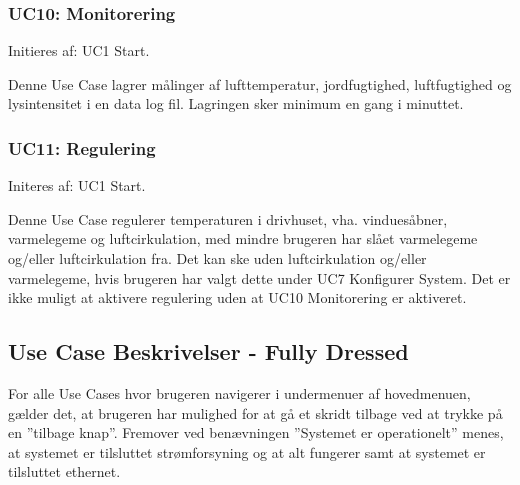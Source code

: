 \subsubsection{UC10: Monitorering}
Initieres af: UC1 Start.

Denne Use Case lagrer målinger af lufttemperatur, jordfugtighed, luftfugtighed og lysintensitet i en data log fil. 
Lagringen sker minimum en gang i minuttet. 

\subsubsection{UC11: Regulering}
Initeres af: UC1 Start.

Denne Use Case regulerer temperaturen i drivhuset, vha. vinduesåbner, varmelegeme og luftcirkulation, med mindre brugeren har slået varmelegeme og/eller luftcirkulation fra. 
Det kan ske uden luftcirkulation og/eller varmelegeme, hvis brugeren har valgt dette under UC7 Konfigurer System. Det er ikke muligt at aktivere regulering uden at UC10 Monitorering er aktiveret.

\clearpage


\subsection{Use Case Beskrivelser - Fully Dressed} \label{sec:usecasebeskrivelser}
For alle Use Cases hvor brugeren navigerer i undermenuer af hovedmenuen, gælder det, at brugeren har mulighed for at gå et skridt tilbage ved at trykke på en ”tilbage knap”. Fremover ved benævningen ”Systemet er operationelt” menes, at systemet er tilsluttet strømforsyning og at alt fungerer samt at systemet er tilsluttet ethernet.


